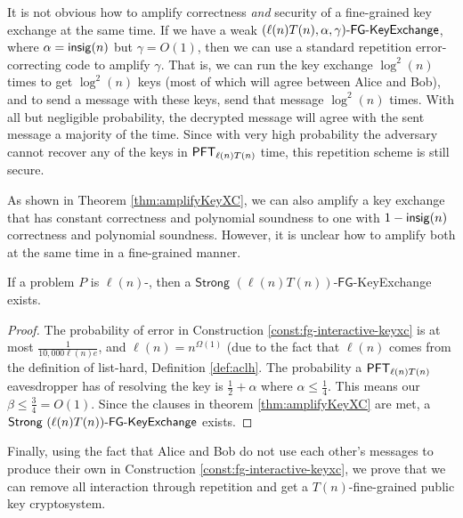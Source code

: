 \begin{remark} It is not obvious how to amplify correctness \emph{and} security of a fine-grained key exchange at the same time. If we have a weak $(\ell(n)T(n), \alpha, \gamma)\textsf{-FG-KeyExchange}$, where $\alpha = \mathsf{insig}(n)$ but $\gamma = O(1)$, then we can use a standard repetition error-correcting code to amplify $\gamma$. That is, we can run the key exchange $\log^2(n)$ times to get $\log^2(n)$ keys (most of which will agree between Alice and Bob), and to send a message with these keys, send that message $\log^2(n)$ times. With all but negligible probability, the decrypted message will agree with the sent message a majority of the time.
Since with very high probability the adversary cannot recover any of the keys in $\mathsf{PFT}_{\ell(n)T(n)}$ time, this repetition scheme is still secure.

As shown in Theorem \ref{thm:amplifyKeyXC}, we can also amplify a key exchange that has constant correctness and polynomial soundness to one with $1 - \mathsf{insig}(n)$ correctness and polynomial soundness. However, it is unclear how to amplify both at the same time in a fine-grained manner.
\end{remark}

\begin{corollary}\label{cor:strongFGKeyXc}
	If a problem $P$ is $\ell(n)$-\keyER, then a $\textsf{Strong }(\ell(n)T(n))$-$\textsf{FG}$-\textsf{Key\-Ex\-change} exists.
\end{corollary}
\begin{proof}
	The probability of error in Construction \ref{const:fg-interactive-keyxc} is at most $\frac{1}{10,000 \ell(n) e}$, and $\ell(n) = n^{\Omega(1)}$ (due to the fact that $\ell(n)$ comes from the definition of list-hard, Definition \ref{def:aclh}. The probability a $\mathsf{PFT}_{\ell(n)T(n)}$ eavesdropper has of resolving the key is $\frac 1 2 + \alpha$ where $\alpha\leq \frac 1 4$. This means our $\beta \leq \frac 3 4 = O(1)$. Since the clauses in theorem \ref{thm:amplifyKeyXC} are met, a $\textsf{Strong } (\ell(n)T(n))\textsf{-FG-KeyExchange}$ exists.
\end{proof}

Finally, using the fact that Alice and Bob do not use each other's messages to produce their own in Construction \ref{const:fg-interactive-keyxc}, we prove that we can remove all interaction through repetition and get a $T(n)$-fine-grained public key cryptosystem.

